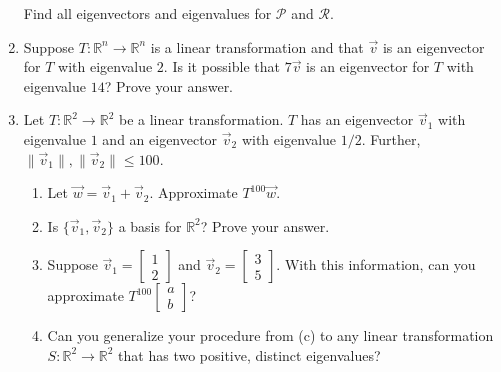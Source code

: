 \documentclass[red]{tutorial}
\newcommand{\R}{\mathbb{R}}
\newcommand{\mat}[1]{\begin{bmatrix}#1\end{bmatrix}}
\theoremstyle{definition}
\theoremstyle{theorem}
\begin{document}
\begin{tutorial}
\begin{enumerate}
		Find all eigenvectors and eigenvalues for $\mathcal P$ and $\mathcal R$.
	\item Suppose $T:\R^n\to\R^n$ is a linear transformation and that $\vec v$ is an eigenvector for
		$T$ with eigenvalue $2$. Is it possible that $7\vec v$ is an eigenvector for $T$ with eigenvalue
		$14$? Prove your answer.

	\item Let $T:\R^2\to\R^2$ be a linear transformation. $T$ has an eigenvector $\vec v_1$ with eigenvalue $1$
		and an eigenvector $\vec v_2$ with eigenvalue $1/2$. Further, $\|\vec v_1\|,\|\vec v_2\|\leq 100$.
		\begin{enumerate}
			\item Let $\vec w=\vec v_1+\vec v_2$. Approximate $T^{100}\vec w$.
			\item Is $\{\vec v_1,\vec v_2\}$ a basis for $\R^2$? Prove your answer.
			\item Suppose $\vec v_1=\mat{1\\2}$ and $\vec v_2=\mat{3\\5}$. With this information,
				can you approximate $T^{100}\mat{a\\b}$?
			\item Can you generalize your procedure from (c) to any linear transformation $S:\R^2\to\R^2$
				that has two positive, distinct eigenvalues?
		\end{enumerate}

\end{enumerate}
	\end{tutorial}
\end{document}
